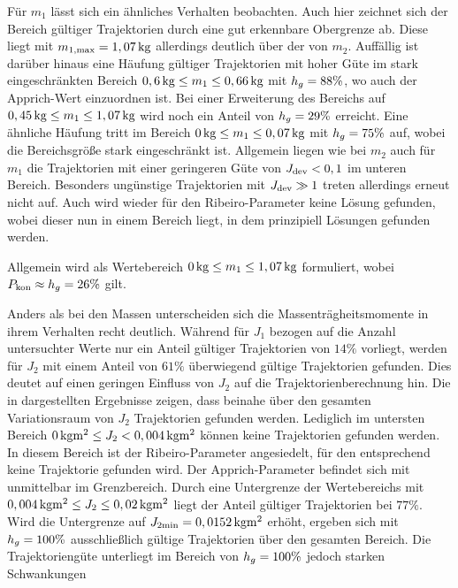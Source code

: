 Für $m_1$ lässt sich ein ähnliches Verhalten beobachten. Auch hier zeichnet sich der Bereich gültiger Trajektorien durch eine gut erkennbare Obergrenze ab. Diese liegt mit $m_{1\mathrm{,max}}=1,07\,\mathrm{kg}$ allerdings deutlich über der von $m_2$. Auffällig ist darüber hinaus eine Häufung gültiger Trajektorien mit hoher Güte im stark eingeschränkten Bereich $0,6\,\mathrm{kg}\leq m_1 \leq0,66\,\mathrm{kg}$ mit $h_g=88\%$, wo auch der Apprich-Wert einzuordnen ist. Bei einer Erweiterung des Bereichs auf $0,45\,\mathrm{kg}\leq m_1 \leq1,07\,\mathrm{kg}$ wird noch ein Anteil von $h_g=29\%$ erreicht. Eine ähnliche Häufung tritt im Bereich $0\,\mathrm{kg}\leq m_1 \leq0,07\,\mathrm{kg}$ mit $h_g=75\%$ auf, wobei die Bereichsgröße stark eingeschränkt ist. Allgemein liegen wie bei $m_2$ auch für $m_1$ die Trajektorien mit einer geringeren Güte von $J_{\mathrm{dev}}<0,1$ im unteren Bereich. Besonders ungünstige Trajektorien mit $J_{\mathrm{dev}}\gg1$ treten allerdings erneut nicht auf. Auch wird wieder für den Ribeiro-Parameter keine Lösung gefunden, wobei dieser nun in einem Bereich liegt, in dem prinzipiell Lösungen gefunden werden.

Allgemein wird als Wertebereich $0\,\mathrm{kg}\leq m_1 \leq1,07\,\mathrm{kg}$ formuliert, wobei $P_{\mathrm{kon}}\approx h_g=26 \%$ gilt. 

Anders als bei den Massen unterscheiden sich die Massenträgheitsmomente in ihrem Verhalten recht deutlich. Während für $J_1$ bezogen auf die Anzahl untersuchter Werte nur ein Anteil gültiger Trajektorien von $14 \%$ vorliegt, werden für $J_2$ mit einem Anteil von $61\%$ überwiegend gültige Trajektorien gefunden. Dies deutet auf einen geringen Einfluss von $J_2$ auf die Trajektorienberechnung hin. Die in  dargestellten Ergebnisse zeigen, dass beinahe über den gesamten Variationsraum von $J_2$ Trajektorien gefunden werden. Lediglich im untersten Bereich $0\,\mathrm{kg m^2}\leq J_2 < 0,004\,\mathrm{kg m^2}$ können keine Trajektorien gefunden werden. In diesem Bereich ist der Ribeiro-Parameter angesiedelt, für den entsprechend keine Trajektorie gefunden wird. Der Apprich-Parameter befindet sich mit  unmittelbar im Grenzbereich. Durch eine Untergrenze der Wertebereichs mit $0,004\,\mathrm{kg m^2}\leq J_2 \leq 0,02\,\mathrm{kg m^2}$ liegt der Anteil gültiger Trajektorien bei $77\%$. Wird die Untergrenze auf $J_{2\mathrm{min}} = 0,0152\,\mathrm{kg m^2}$ erhöht, ergeben sich mit $h_g=100 \%$ ausschließlich gültige Trajektorien über den gesamten Bereich. Die Trajektoriengüte unterliegt im Bereich von $h_g=100 \%$ jedoch starken Schwankungen


